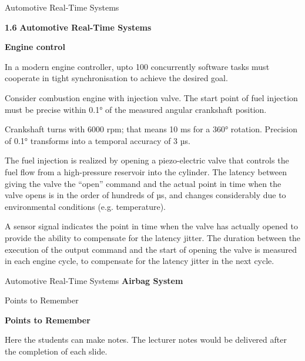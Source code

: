 \begin{frame}{Automotive Real-Time Systems}

\textbf{1.6} \protect\hypertarget{teil7}{}{}\textbf{Automotive Real-Time
Systems}

\textbf{Engine control}

In a modern engine controller, upto 100 concurrently software tasks must
cooperate in tight synchronisation to achieve the desired goal.

Consider combustion engine with injection valve. The start point of fuel
injection must be precise within 0.1° of the measured angular crankshaft
position.

Crankshaft turns with 6000 rpm; that means 10 ms for a 360° rotation.
Precision of 0.1° transforms into a temporal accuracy of 3 µs.

The fuel injection is realized by opening a piezo-electric valve that
controls the fuel flow from a high-pressure reservoir into the cylinder.
The latency between giving the valve the ``open'' command and the actual
point in time when the valve opens is in the order of hundreds of µs,
and changes considerably due to environmental conditions (e.g.
temperature).

A sensor signal indicates the point in time when the valve has actually
opened to provide the ability to compensate for the latency jitter. The
duration between the execution of the output command and the start of
opening the valve is measured in each engine cycle, to compensate for
the latency jitter in the next cycle.

\end{frame}

\begin{frame}{Automotive Real-Time Systems}
\textbf{Airbag System}

\end{frame}

\begin{frame}{Points to Remember}

\protect\hypertarget{teil8}{}{}\textbf{Points to Remember}

\protect\hypertarget{teil8-1}{}{\protect\hypertarget{teil8}{}{}}

Here the students can make notes. The lecturer notes would be delivered
after the completion of each slide.

\end{frame}


